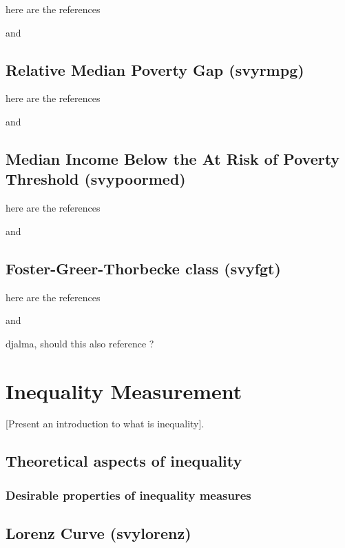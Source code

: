 \documentclass[]{book}
\begin{document}
here are the references

\citep{osier2009} and \citep{deville1999}

\section{Relative Median Poverty Gap
(svyrmpg)}\label{relative-median-poverty-gap-svyrmpg}

here are the references

\citep{osier2009} and \citep{deville1999}

\section{Median Income Below the At Risk of Poverty Threshold
(svypoormed)}\label{median-income-below-the-at-risk-of-poverty-threshold-svypoormed}

here are the references

\citep{osier2009} and \citep{deville1999}

\section{Foster-Greer-Thorbecke class
(svyfgt)}\label{foster-greer-thorbecke-class-svyfgt}

here are the references

\citep{osier2009} and \citep{deville1999}

djalma, should this also reference \citep{foster1984} ?

\chapter{Inequality Measurement}\label{inequality}

{[}Present an introduction to what is inequality{]}.

\section{Theoretical aspects of
inequality}\label{theoretical-aspects-of-inequality}

\subsection{Desirable properties of inequality
measures}\label{desirable-properties-of-inequality-measures}

\section{Lorenz Curve (svylorenz)}\label{lorenz-curve-svylorenz}
\end{document}
